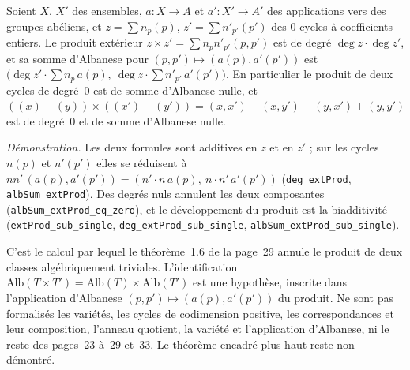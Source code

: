 \begin{encadre}
\begin{enonce}
Soient $X$, $X'$ des ensembles, $a : X \to A$ et $a' : X' \to A'$ des applications vers des groupes abéliens, et $z = \sum n_p (p)$, $z' = \sum n'_{p'} (p')$ des $0$-cycles à coefficients entiers. Le produit extérieur $z \times z' = \sum n_p n'_{p'} (p, p')$ est de degré $\deg z \cdot \deg z'$, et sa somme d'Albanese pour $(p, p') \mapsto (a(p), a'(p'))$ est $\bigl(\deg z' \cdot \sum n_p\, a(p),\ \deg z \cdot \sum n'_{p'}\, a'(p')\bigr)$. En particulier le produit de deux cycles de degré~$0$ est de somme d'Albanese nulle, et $((x) - (y)) \times ((x') - (y')) = (x, x') - (x, y') - (y, x') + (y, y')$ est de degré~$0$ et de somme d'Albanese nulle.
\end{enonce}
\end{encadre}
{\small \emph{Démonstration.} Les deux formules sont additives en $z$ et en $z'$ ; sur les cycles $n(p)$ et $n'(p')$ elles se réduisent à $nn'\,(a(p), a'(p')) = (n' \cdot n\,a(p),\ n \cdot n'\,a'(p'))$ (\texttt{deg\_extProd}, \texttt{albSum\_extProd}). Des degrés nuls annulent les deux composantes (\texttt{albSum\_extProd\_eq\_zero}), et le développement du produit est la biadditivité (\texttt{extProd\_sub\_single}, \texttt{deg\_extProd\_sub\_single}, \texttt{albSum\_extProd\_sub\_single}).

C'est le calcul par lequel le théorème~1.6 de la page~29 annule le produit de deux classes algébriquement triviales. L'identification $\mathrm{Alb}(T \times T') = \mathrm{Alb}(T) \times \mathrm{Alb}(T')$ est une hypothèse, inscrite dans l'application d'Albanese $(p, p') \mapsto (a(p), a'(p'))$ du produit. Ne sont pas formalisés les variétés, les cycles de codimension positive, les correspondances et leur composition, l'anneau quotient, la variété et l'application d'Albanese, ni le reste des pages~23 à~29 et~33. Le théorème encadré plus haut reste non démontré.\par}

